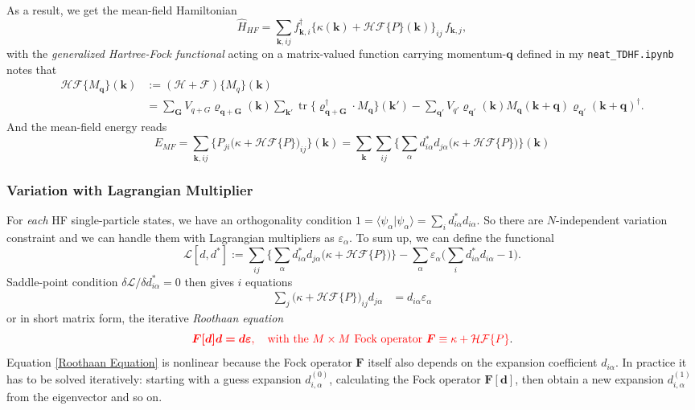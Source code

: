 \documentclass[aps,prb,nofootinbib,reprint,onecolumn]{revtex4-2}
\begin{document}
				As a result, we get the mean-field Hamiltonian
				\begin{equation}\label{mean-field Hamiltonian}
					\hat H_{HF}=\sum_{\bm k,ij}f_{\bm k,i}^\dagger\bigg\{\kappa(\bm k)+\mathcal{HF}\{P\}(\bm k)\bigg\}_{ij}\,f_{\bm k,j},
				\end{equation}
				with the \emph{generalized Hartree-Fock functional} acting on a matrix-valued function carrying momentum-$\bm q$ defined in my \texttt{neat\_TDHF.ipynb} notes that
				\begin{align}\label{generalized Hartree Fock functional}
					\mathcal{HF}\{M_{\bm q}\}(\bm k)&:=(\mathcal H+\mathcal F)\{M_q\}(\bm k)\nonumber\\
					&=\sum_{\bm G} V_{q+G}\varrho_{\bm{q+G}}(\bm k)\sum_{\bm k'}\mathop{\mathrm{tr}}\bigg\{\varrho_{\bm{q+G}}^\dagger\cdot M_{\bm q}\bigg\}(\bm k') - \sum_{\bm q'} V_{q'}\varrho_{\bm q'}(\bm k)M_{\bm q}(\bm{k+q})\varrho_{\bm q'}(\bm{k+q})^\dagger.
				\end{align}
				And the mean-field energy reads
				\begin{equation}\label{mean-field Energy}
					E_{MF}=\sum_{\bm k, ij}\bigg\{P_{ji}\big(\kappa +\mathcal{HF}\{P\}\big)_{ij}\bigg\}(\bm k)=\sum_{\bm k}\sum_{ij}\bigg\{\sum_\alpha d_{i\alpha}^* d_{j\alpha}\big(\kappa +\mathcal{HF}\{P\}\big)\bigg\}(\bm k)
				\end{equation}

			\subsubsection{Variation with Lagrangian Multiplier}
				For \emph{each} HF single-particle states, we have an orthogonality condition $1=\langle\psi_\alpha|\psi_\alpha\rangle=\sum_i d_{i\alpha}^* d_{i\alpha}$. So there are $N$-independent variation constraint and we can handle them with Lagrangian multipliers as $\varepsilon_\alpha$. To sum up, we can define the functional
				\begin{equation*}
					\mathcal L[d,d^*]:=\sum_{ij}\bigg\{\sum_\alpha d_{i\alpha}^* d_{j\alpha}\big(\kappa +\mathcal{HF}\{P\}\big)\bigg\}-\sum_\alpha \varepsilon_\alpha\bigg(\sum_i d_{i\alpha}^* d_{i\alpha}-1\bigg).
				\end{equation*}
				Saddle-point condition $\delta\mathcal L/\delta d_{i\alpha}^*=0$ then gives $i$ equations
				\begin{align}
					\sum_j\big(\kappa +\mathcal{HF}\{P\}\big)_{ij}d_{j\alpha}&=d_{i\alpha}\varepsilon_\alpha
				\end{align}
				or in short matrix form, the iterative \emph{Roothaan equation}
				\begin{equation}\label{Roothaan Equation}
					{\color{red}\bm{F[d]d=d\varepsilon},\quad\text{with the $M\times M$ Fock operator }\bm F\equiv\kappa+\mathcal{HF}\{P\}}.
				\end{equation}
				Equation \eqref{Roothaan Equation} is nonlinear because the Fock operator $\bm F$ itself also depends on the expansion coefficient $d_{i\alpha}$. In practice it has to be solved iteratively: starting with a guess expansion $d_{i,\alpha}^{(0)}$, calculating the Fock operator $\bm{F[d]}$, then obtain a new expansion $d_{i,\alpha}^{(1)}$ from the eigenvector and so on. 
\end{document}
